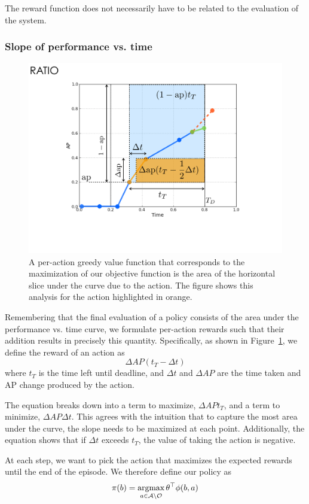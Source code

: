 \documentclass[runningheads]{llncs}
\begin{document}
The reward function does not necessarily have to be related to the evaluation of the system.

\subsubsection{Slope of performance vs. time}
\begin{figure}[htb]
  \centering
  \includegraphics[width=0.56\linewidth]{figures/apvst_expl.pdf}
  \caption{A per-action greedy value function that corresponds to the maximization of our objective function is the area of the horizontal slice under the curve due to the action. The figure shows this analysis for the action highlighted in orange.}
  \label{fig:rewards}
\end{figure}

Remembering that the final evaluation of a policy consists of the area under the performance vs. time curve, we formulate per-action rewards such that their addition results in precisely this quantity.
Specifically, as shown in Figure~\ref{fig:rewards}, we define the reward of an action as
\begin{equation}\label{eq:advanced}
\Delta AP (t_T-\Delta t)
\end{equation}
where $t_T$ is the time left until deadline, and $\Delta t$ and $\Delta AP$ are the time taken and AP change produced by the action.

The equation breaks down into a term to maximize, $\Delta AP t_T$, and a term to minimize, $\Delta AP \Delta t$.
This agrees with the intuition that to capture the most area under the curve, the slope needs to be maximized at each point.
Additionally, the equation shows that if $\Delta t$ exceeds $t_T$, the value of taking the action is negative.

At each step, we want to pick the action that maximizes the expected rewards until the end of the episode.
We therefore define our policy as
\begin{equation}
\pi(b) = \argmax_{a \in \mathcal{A} \setminus \mathcal{O}} \theta^\top \phi(b,a)
\end{equation}
\end{document}
